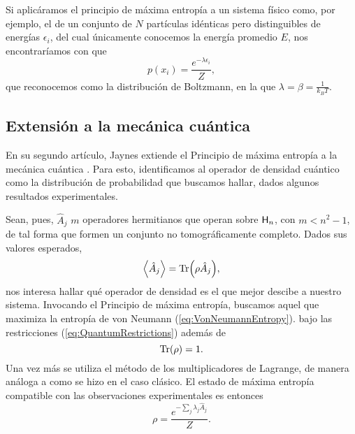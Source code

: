 Si aplicáramos el principio de máxima entropía a un sistema físico  como, por ejemplo, el de un conjunto de $N$ partículas idénticas pero distinguibles de energías $\epsilon_{i}$, del cual únicamente conocemos la energía promedio $E$, nos encontraríamos con que
\begin{equation}\label{eq:Boltzman}
    p(x_{i})=\frac{e^{-\lambda\epsilon_{i}}}{Z},
\end{equation}
que reconocemos como la distribución de Boltzmann, en la que $\lambda=\beta=\frac{1}{k_{B}T}$. 
\subsection{Extensión a la mecánica cuántica}

En su segundo artículo, Jaynes extiende el Principio de máxima entropía a la mecánica cuántica \cite{JaynesII}. Para esto, identificamos al operador de densidad cuántico como la distribución de probabilidad que buscamos hallar, dados algunos resultados experimentales.

Sean, pues, $\hat{A}_{j}$ $m$ operadores hermitianos que operan sobre ${\sf H}_{n}$, con $m<n^{2}-1$, de tal forma que formen un conjunto no tomográficamente completo. Dados sus valores esperados,
\begin{equation}\label{eq:QuantumRestrictions}
    \expval{\hat{A}_{j}}=\Tr(\rho \hat{A}_{j}),
\end{equation} 
nos interesa hallar qué operador de densidad es el que mejor descibe a nuestro sistema. Invocando el Principio de máxima entropía, buscamos aquel que maximiza la entropía de von Neumann (\ref{eq:VonNeumannEntropy}). bajo las restricciones (\ref{eq:QuantumRestrictions}) además de
\begin{equation}\label{eq:TraceRestriction}
    \Tr(\rho)=1.
\end{equation}
Una vez más se utiliza el método de los multiplicadores de Lagrange, de manera análoga a como se hizo en el caso clásico. El estado de máxima entropía compatible con las observaciones experimentales es entonces
\begin{equation*}
    \rho=\frac{e^{-\sum_{j} \lambda_{j} \hat{A}_{j}}}{Z}.
\end{equation*}
